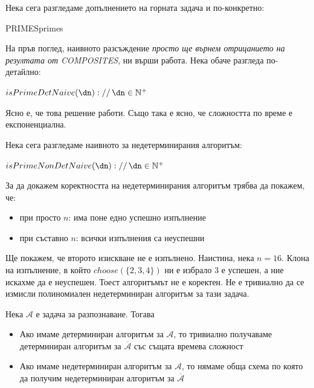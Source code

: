 \leavevmode\newline\noindent
Нека сега разгледаме допълнението на горната задача и по-конкретно:
\begin{boxzzr}{PRIMES}{primes}
\end{boxzzr}
\begin{solution}
	На пръв поглед, наивното разсъждение \emph{просто ще върнем отрицанието на резултата от COMPOSITES}, ни върши работа. Нека обаче разгледа по-детайлно:
	\begin{pseudocode}
		
		$isPrimeDetNaive(\dn)://\,\dn\in\mathbb{N}^+$
		\Mybegin
		{	
		}
	\end{pseudocode}
	Ясно е, че това решение работи. Също така е ясно, че сложността по време е експоненциална.
	
	\vspace{0.3cm}\noindent
	Нека сега разгледаме наивното за недетерминирания алгоритъм:
	\begin{pseudocode}
		\SetKwData{dn}{n}
		
		$isPrimeNonDetNaive(\dn)://\,\dn\in\mathbb{N}^+$
		\Mybegin
		{	
			\KwRet{$\lnot isCompositeNonDet(\dn)$\;}
		}
	\end{pseudocode}
	За да докажем коректността на недетерминирания алгоритъм трябва да покажем, че:
	\begin{itemize}
		\item при просто $n$: има поне едно успешно изпълнение
		\item при съставно $n$: всички изпълнения са неуспешни
	\end{itemize}
	Ще покажем, че второто изискване не е изпълнено. Наистина, нека $n=16$. Клона на изпълнение, в който $choose(\{2,3,4\})$ ни е избрало 3 е успешен, а ние искахме да е неуспешен. Тоест алгоритъмът не е коректен. Не е тривиално да се измисли полиномиален недетерминиран алгоритъм за тази задача.
\end{solution}
\vspace{0.3cm}
\begin{boxremark*}{}
	Нека $\mathscr{A}$ е задача за разпознаване. Тогава
	\begin{itemize}
		\item Ако имаме детерминиран алгоритъм за $\mathscr{A}$, то тривиално получаваме детерминиран алгоритъм за $\overline{\mathscr{A}}$ със същата времева сложност
		\item Ако имаме недетерминиран алгоритъм за $\mathscr{A}$, то нямаме обща схема по която да получим недетерминиран алгоритъм за $\overline{\mathscr{A}}$
	\end{itemize}
\end{boxremark*}

